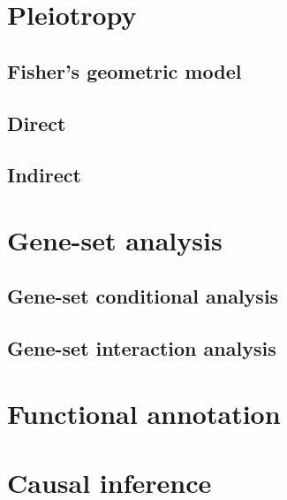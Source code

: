 \documentclass[
]{book}
\begin{document}
\hypertarget{pleiotropy}{%
\chapter{Pleiotropy}\label{pleiotropy}}

\hypertarget{fishers-geometric-model}{%
\section{Fisher's geometric model}\label{fishers-geometric-model}}

\hypertarget{direct}{%
\section{Direct}\label{direct}}

\hypertarget{indirect}{%
\section{Indirect}\label{indirect}}

\hypertarget{gene-set-analysis}{%
\chapter{Gene-set analysis}\label{gene-set-analysis}}

\hypertarget{gene-set-conditional-analysis}{%
\section{Gene-set conditional analysis}\label{gene-set-conditional-analysis}}

\hypertarget{gene-set-interaction-analysis}{%
\section{Gene-set interaction analysis}\label{gene-set-interaction-analysis}}

\hypertarget{functional-annotation}{%
\chapter{Functional annotation}\label{functional-annotation}}

\hypertarget{causal-inference}{%
\chapter{Causal inference}\label{causal-inference}}
\end{document}
